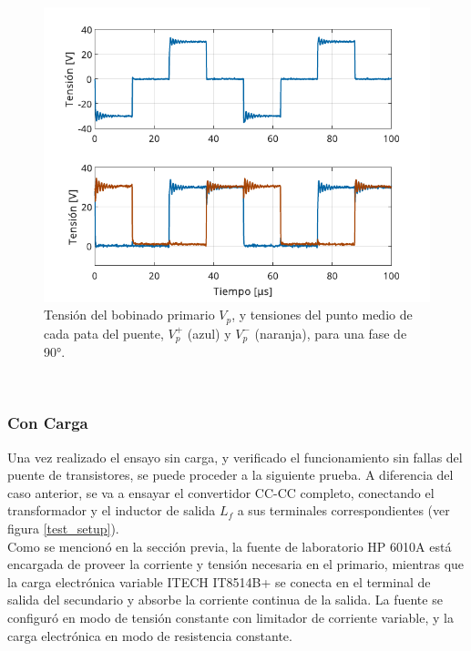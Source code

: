 \begin{figure}[h]
    \centering
    \includegraphics[scale=1]{Imagenes/Sin Carga - Fase 90.pdf}
    \caption{Tensión del bobinado primario $V_p$, y tensiones del punto medio de cada pata del puente, $V_p^+$ (azul) y $V_p^-$ (naranja), para una fase de 90°.}
    \label{SinCarga90}
\end{figure}

\lipsum[4]\\

\subsubsection{Con Carga}

Una vez realizado el ensayo sin carga, y verificado el funcionamiento sin fallas del puente de transistores, se puede proceder a la siguiente prueba. A diferencia del caso anterior, se va a ensayar el convertidor CC-CC completo, conectando el transformador y el inductor de salida $L_f$ a sus terminales correspondientes (ver figura \ref{test_setup}).\\

Como se mencionó en la sección previa, la fuente de laboratorio HP 6010A está encargada de proveer la corriente y tensión necesaria en el primario, mientras que la carga electrónica variable ITECH IT8514B+ se conecta en el terminal de salida del secundario y absorbe la corriente continua de la salida. La fuente se configuró en modo de tensión constante con limitador de corriente variable, y la carga electrónica en modo de resistencia constante.\\


